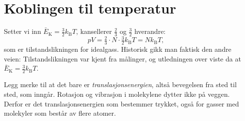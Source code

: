 \documentclass[../Main.tex]{subfiles}
\begin{document}

\section{Koblingen til temperatur}

Setter vi inn $\bar{E}_\text{K} = \tfrac{3}{2}k_\text{B}T$, kansellerer $\tfrac{2}{3}$ og $\tfrac{3}{2}$ hverandre:
\[
  pV = \tfrac{2}{3}\cdot N\cdot\tfrac{3}{2}k_\text{B}T = Nk_\text{B}T ,
\]
som er tilstandslikningen for idealgass. Historisk gikk man faktisk den andre veien: Tilstandslikningen var kjent fra målinger, og utledningen over viste da at $\bar{E}_\text{K} = \tfrac{3}{2}k_\text{B}T$.

Legg merke til at det bare er \emph{translasjonsenergien}, altså bevegelsen fra sted til sted, som inngår. Rotasjon og vibrasjon i molekylene dytter ikke på veggen. Derfor er det translasjonsenergien som bestemmer trykket, også for gasser med molekyler som består av flere atomer.
\end{document}
